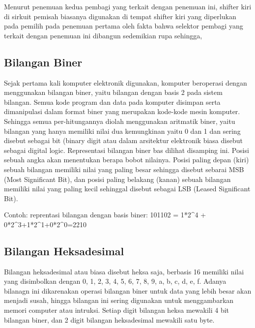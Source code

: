 Menurut penemuan kedua pembagi yang terkait dengan penemuan ini, shifter kiri di sirkuit pemisah biasanya digunakan di tempat shifter kiri yang diperlukan pada pemilih pada penemuan pertama oleh fakta bahwa selektor pembagi yang terkait dengan penemuan ini dibangun sedemikian rupa sehingga, 

\subsection{Bilangan Biner}
Sejak pertama kali komputer elektronik digunakan, komputer beroperasi dengan menggunakan bilangan biner, yaitu bilangan dengan basis 2 pada sistem bilangan. Semua kode program dan data pada komputer disimpan serta dimanipulasi dalam format biner yang merupakan kode-kode mesin komputer. Sehingga semua per-hitungannya diolah menggunakan aritmatik biner, yaitu bilangan yang hanya memiliki nilai dua kemungkinan yaitu 0 dan 1 dan sering disebut sebagai bit (binary digit atau dalam arsitektur elektronik biasa disebut sebagai digital logic. Representasi bilangan biner bas dilihat disamping ini. Posisi sebuah angka akan menentukan berapa bobot nilainya. Posisi paling depan (kiri) sebuah bilangan memiliki nilai yang paling besar sehingga disebut sebarai MSB (Most Significant Bit), dan posisi paling belakang (kanan) sebuah bilangan memiliki nilai yang paling kecil sehinggal disebut sebagai LSB (Leased Significant Bit).

Contoh: reprentasi bilangan dengan basis biner:
101102 = 1*2^4 + 0*2^3+1*2^1+0*2^0=2210

\subsection{Bilangan Heksadesimal}
Bilangan heksadesimal atau biasa disebut heksa saja, berbasis 16 memiliki nilai yang disimbolkan dengan 0, 1, 2, 3, 4, 5, 6, 7, 8, 9, a, b, c, d, e, f. Adanya bilanagn ini dikarenakan operasi bilangan biner untuk data yang lebih besar akan menjadi susah, hingga bilangan ini sering digunakan untuk menggambarkan memori computer atau intruksi. Setiap digit bilangan heksa mewakili 4 bit bilangan biner, dan 2 digit bilangan heksadesimal mewakili satu byte.
